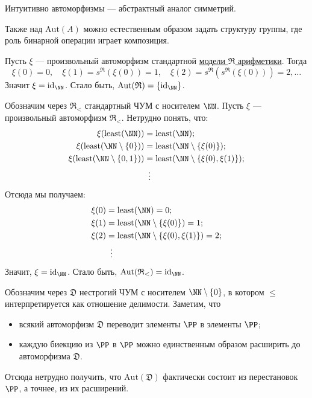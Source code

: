 \documentclass[12pt,a4paper]{article}
\newcommand{\id}{\ensuremath{\mathrm{id}}\xspace}
\newcommand{\Aut}{\ensuremath{\mathrm{Aut}}\xspace}
\newcommand{\least}{\ensuremath{\mathrm{least}}\xspace}
\begin{document}
    \begin{remark*}
        Интуитивно автоморфизмы --- абстрактный аналог симметрий.

        Также над $\Aut(A)$ можно естественным образом задать структуру группы, где роль бинарной операции играет композиция.
    \end{remark*}

    \begin{example}
        Пусть $\xi$ --- произвольный автоморфизм стандартной \hyperlink{R-structure-definition}{модели $\mathfrak{R}$ арифметики}. Тогда
        \[
            \xi(0) = 0, \quad
            \xi(1) = s^\mathfrak{R}(\xi(0)) = 1, \quad
            \xi(2) = s^\mathfrak{R}(s^\mathfrak{R}(\xi(0))) = 2, \dots
        \]
        Значит $\xi = \id_{\NN}$. Стало быть, $\Aut(\mathfrak{R}) = \{\id_{\NN}\}$.
    \end{example}

    \begin{example}\hypertarget{R_le-structure-definition}{}
        Обозначим через $\mathfrak{R}_{<}$ стандартный ЧУМ с носителем $\NN$. Пусть $\xi$ --- произвольный автоморфизм $\mathfrak{R}_{<}$. Нетрудно понять, что:
        \begin{align*}
            \xi(\least(\NN)) &= \least(\NN);\\
            \xi(\least(\NN \setminus \{0\})) &= \least(\NN \setminus \{\xi(0)\});\\
            \xi(\least(\NN \setminus \{0, 1\})) &= \least(\NN \setminus \{\xi(0), \xi(1)\});\\
            &\hspace{0.5em}\vdots
        \end{align*}
        Отсюда мы получаем:
        \begin{align*}
            \xi(0) &= \least(\NN) = 0;\\
            \xi(1) &= \least(\NN \setminus \{\xi(0)\}) = 1;\\
            \xi(2) &= \least(\NN \setminus \{\xi(0), \xi(1)\}) = 2;\\
            &\hspace{0.5em}\vdots
        \end{align*}
        Значит, $\xi = \id_{\NN}$. Стало быть, $\Aut(\mathfrak{R}_{<}) = \id_{\NN}$.
    \end{example}

    \begin{example}\hypertarget{D-structure-definition}{}
        Обозначим через $\mathfrak{D}$ нестрогий ЧУМ с носителем $\NN \setminus \{0\}$, в котором $\leqslant$ интерпретируется как отношение делимости. Заметим, что
        \begin{itemize}
            \item всякий автоморфизм $\mathfrak{D}$ переводит элементы $\PP$ в элементы $\PP$;
            \item каждую биекцию из $\PP$ в $\PP$ можно единственным образом расширить до автоморфизма $\mathfrak{D}$.
        \end{itemize}
        Отсюда нетрудно получить, что $\Aut(\mathfrak{D})$ фактически состоит из перестановок $\PP$, а точнее, из их расширений.
    \end{example}
\end{document}
